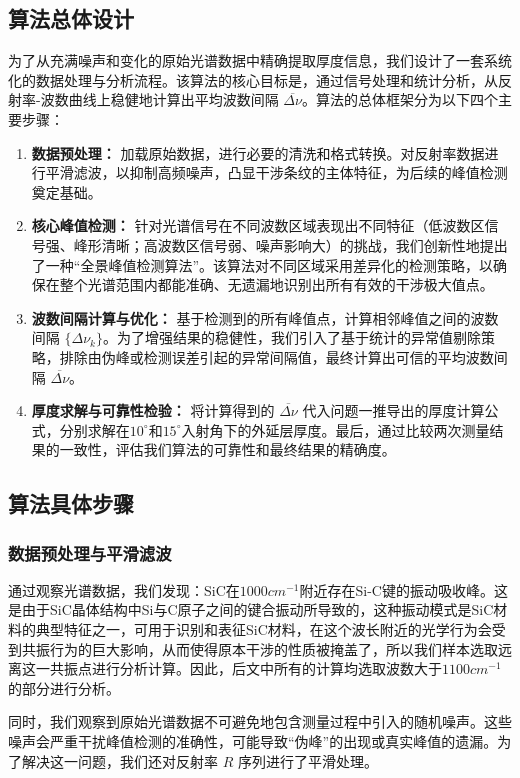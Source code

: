 \documentclass[withoutpreface,bwprint]{cumcmthesis} %
\begin{document}
\subsection{算法总体设计}
为了从充满噪声和变化的原始光谱数据中精确提取厚度信息，我们设计了一套系统化的数据处理与分析流程。该算法的核心目标是，通过信号处理和统计分析，从反射率-波数曲线上稳健地计算出平均波数间隔 $\overline{\Delta\nu}$。算法的总体框架分为以下四个主要步骤：
\begin{enumerate}
    \item \textbf{数据预处理：} 加载原始数据，进行必要的清洗和格式转换。对反射率数据进行平滑滤波，以抑制高频噪声，凸显干涉条纹的主体特征，为后续的峰值检测奠定基础。
    \item \textbf{核心峰值检测：} 针对光谱信号在不同波数区域表现出不同特征（低波数区信号强、峰形清晰；高波数区信号弱、噪声影响大）的挑战，我们创新性地提出了一种“全景峰值检测算法”。该算法对不同区域采用差异化的检测策略，以确保在整个光谱范围内都能准确、无遗漏地识别出所有有效的干涉极大值点。
    \item \textbf{波数间隔计算与优化：} 基于检测到的所有峰值点，计算相邻峰值之间的波数间隔 $\{\Delta\nu_k\}$。为了增强结果的稳健性，我们引入了基于统计的异常值剔除策略，排除由伪峰或检测误差引起的异常间隔值，最终计算出可信的平均波数间隔 $\overline{\Delta\nu}$。
    \item \textbf{厚度求解与可靠性检验：} 将计算得到的 $\overline{\Delta\nu}$ 代入问题一推导出的厚度计算公式，分别求解在$10^\circ$和$15^\circ$入射角下的外延层厚度。最后，通过比较两次测量结果的一致性，评估我们算法的可靠性和最终结果的精确度。
\end{enumerate}

\subsection{算法具体步骤}

\subsubsection{数据预处理与平滑滤波}

通过观察光谱数据，我们发现：SiC在$1000cm^{-1}$附近存在Si-C键的振动吸收峰。这是由于SiC晶体结构中Si与C原子之间的键合振动所导致的，这种振动模式是SiC材料的典型特征之一，可用于识别和表征SiC材料，在这个波长附近的光学行为会受到共振行为的巨大影响，从而使得原本干涉的性质被掩盖了，所以我们样本选取远离这一共振点进行分析计算。因此，后文中所有的计算均选取波数大于$1100cm^{-1}$的部分进行分析。

同时，我们观察到原始光谱数据不可避免地包含测量过程中引入的随机噪声。这些噪声会严重干扰峰值检测的准确性，可能导致“伪峰”的出现或真实峰值的遗漏。为了解决这一问题，我们还对反射率 $R$ 序列进行了平滑处理。
\end{document}
